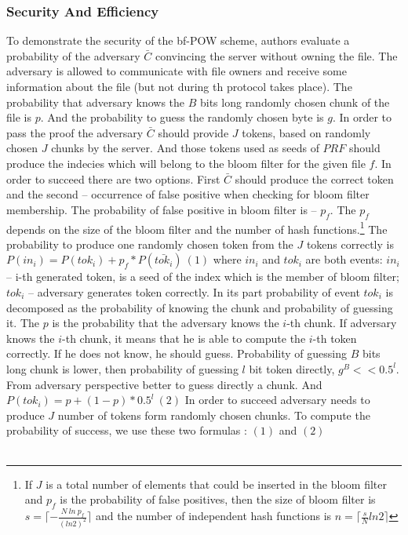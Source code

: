 \documentclass[12pt]{article}
\begin{document}
\subsubsection{Security And Efficiency}
\label{subsub:secAndeff6}


To demonstrate the security of the bf-POW scheme, authors evaluate a probability of the adversary $\bar{C}$ convincing the server without owning the file. The adversary is allowed to communicate with file owners and receive some information about the file (but not during th protocol takes place). The probability that adversary knows the $B$ bits long randomly chosen chunk of the file is $p$. And the probability to guess the randomly chosen byte is $g$. In order to pass the proof the adversary $\bar{C}$ should provide $J$ tokens, based on randomly chosen $J$ chunks by the server. And those tokens used as seeds of $PRF$ should produce the indecies which will belong to the bloom filter for the given file $f$. In order to succeed there are two options. First $\bar{C}$ should produce the correct token and the second -- occurrence of false positive when checking for bloom filter membership. The probability of false positive in bloom filter is -- $p_f$. The $p_f$ depends on the size of the bloom filter and the number of hash functions.\footnote{If $J$ is a total number of elements that could be inserted in the bloom filter and $p_f$ is the probability of false positives, then the size of bloom filter is $s=\lceil - \frac {N\ ln\ p_f} {(ln2)^2}\rceil$ and the number of independent hash functions is $n=\lceil\frac{s} {N}ln2\rceil$} The probability to produce one randomly chosen token from the $J$ tokens correctly is $P(in_i)=P(tok_i)+p_f*P(\bar{tok_i}) \  (1)$ where $in_i$ and $tok_i$ are both events: $in_i$ --  i-th generated token, is a seed of the index which is the member of bloom filter; $tok_i$ -- adversary generates token correctly. In its part probability of event $tok_i$ is decomposed as the probability of knowing the chunk and probability of guessing it. The $p$ is the probability that the adversary knows the $i$-th chunk.  If adversary knows the $i$-th chunk, it means that he is able to compute the $i$-th token correctly. If he does not know, he should guess. Probability of guessing $B$ bits long chunk is lower, then probability of guessing $l$ bit token directly, $g^B << 0.5^l$. From adversary perspective better to guess directly a chunk. And $P(tok_i)=p+(1-p)*0.5^l \  (2) $ In order to succeed adversary needs to produce $J$ number of tokens form randomly chosen chunks. To compute the probability of success, we use these two formulas : $(1)$ and $(2)$\\\\
\end{document}
